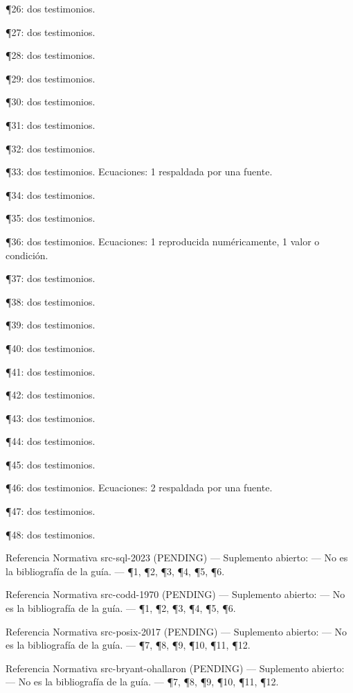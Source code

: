 \documentclass{book}
\begin{document}
\noindent ¶26: dos testimonios.

\noindent ¶27: dos testimonios.

\noindent ¶28: dos testimonios.

\noindent ¶29: dos testimonios.

\noindent ¶30: dos testimonios.

\noindent ¶31: dos testimonios.

\noindent ¶32: dos testimonios.

\noindent ¶33: dos testimonios. Ecuaciones: 1 respaldada por una fuente.

\noindent ¶34: dos testimonios.

\noindent ¶35: dos testimonios.

\noindent ¶36: dos testimonios. Ecuaciones: 1 reproducida numéricamente, 1 valor o condición.

\noindent ¶37: dos testimonios.

\noindent ¶38: dos testimonios.

\noindent ¶39: dos testimonios.

\noindent ¶40: dos testimonios.

\noindent ¶41: dos testimonios.

\noindent ¶42: dos testimonios.

\noindent ¶43: dos testimonios.

\noindent ¶44: dos testimonios.

\noindent ¶45: dos testimonios.

\noindent ¶46: dos testimonios. Ecuaciones: 2 respaldada por una fuente.

\noindent ¶47: dos testimonios.

\noindent ¶48: dos testimonios.

\medskip

\noindent Referencia Normativa src-sql-2023 (PENDING) --- Suplemento abierto: --- No es la bibliografía de la guía. --- \P1, \P2, \P3, \P4, \P5, \P6.

\noindent Referencia Normativa src-codd-1970 (PENDING) --- Suplemento abierto: --- No es la bibliografía de la guía. --- \P1, \P2, \P3, \P4, \P5, \P6.

\noindent Referencia Normativa src-posix-2017 (PENDING) --- Suplemento abierto: --- No es la bibliografía de la guía. --- \P7, \P8, \P9, \P10, \P11, \P12.

\noindent Referencia Normativa src-bryant-ohallaron (PENDING) --- Suplemento abierto: --- No es la bibliografía de la guía. --- \P7, \P8, \P9, \P10, \P11, \P12.
\end{document}
